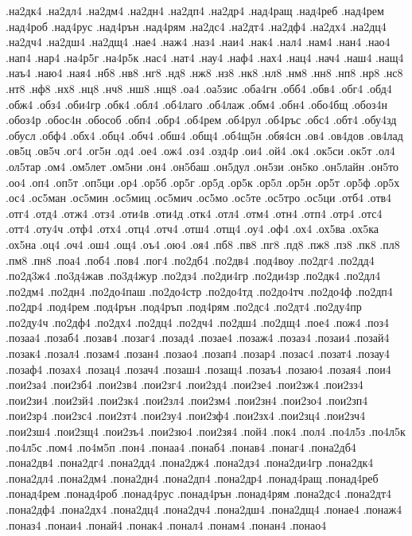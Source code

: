{.на2дк4
.на2дл4
.на2дм4
.на2дн4
.на2дп4
.на2др4
.над4ращ
.над4реб
.над4рем
.над4роб
.над4рус
.над4рън
.над4рям
.на2дс4
.на2дт4
.на2дф4
.на2дх4
.на2дц4
.на2дч4
.на2дш4
.на2дщ4
.нае4
.наж4
.наз4
.наи4
.нак4
.нал4
.нам4
.нан4
.нао4
.нап4
.нар4
.на4р5г
.на4р5к
.нас4
.нат4
.нау4
.наф4
.нах4
.нац4
.нач4
.наш4
.нащ4
.наъ4
.наю4
.ная4
.нб8
.нв8
.нг8
.нд8
.нж8
.нз8
.нк8
.нл8
.нм8
.нн8
.нп8
.нр8
.нс8
.нт8
.нф8
.нх8
.нц8
.нч8
.нш8
.нщ8
.оа4
.оа5зис
.оба4гн
.обб4
.обв4
.обг4
.обд4
.обж4
.обз4
.оби4гр
.обк4
.обл4
.об4лаго
.об4лаж
.обм4
.обн4
.обо4бщ
.обоз4н
.обоз4р
.обос4н
.обособ
.обп4
.обр4
.об4рем
.об4рул
.об4ръс
.обс4
.обт4
.обу4зд
.обусл
.обф4
.обх4
.обц4
.обч4
.обш4
.общ4
.об4щ5н
.обя4сн
.ов4
.ов4дов
.ов4лад
.ов5ц
.ов5ч
.ог4
.ог5н
.од4
.ое4
.ож4
.оз4
.озд4р
.ои4
.ой4
.ок4
.ок5си
.ок5т
.ол4
.ол5тар
.ом4
.ом5лет
.ом5ни
.он4
.он5баш
.он5дул
.он5зи
.он5ко
.он5лайн
.он5то
.оо4
.оп4
.оп5т
.оп5ци
.ор4
.ор5б
.ор5г
.ор5д
.ор5к
.ор5л
.ор5н
.ор5т
.ор5ф
.ор5х
.ос4
.ос5ман
.ос5мин
.ос5миц
.ос5мич
.ос5мо
.ос5те
.ос5тро
.ос5ци
.отб4
.отв4
.отг4
.отд4
.отж4
.отз4
.оти4в
.оти4д
.отк4
.отл4
.отм4
.отн4
.отп4
.отр4
.отс4
.отт4
.оту4ч
.отф4
.отх4
.отц4
.отч4
.отш4
.отщ4
.оу4
.оф4
.ох4
.ох5ва
.ох5ка
.ох5на
.оц4
.оч4
.ош4
.ощ4
.оъ4
.ою4
.оя4
.пб8
.пв8
.пг8
.пд8
.пж8
.пз8
.пк8
.пл8
.пм8
.пн8
.поа4
.поб4
.пов4
.пог4
.по2дб4
.по2дв4
.под4воу
.по2дг4
.по2дд4
.по2д3ж4
.по3д4жав
.по3д4жур
.по2дз4
.по2ди4гр
.по2ди4зр
.по2дк4
.по2дл4
.по2дм4
.по2дн4
.по2до4паш
.по2до4стр
.по2до4тд
.по2до4тч
.по2до4ф
.по2дп4
.по2др4
.под4рем
.под4рън
.под4ръп
.под4рям
.по2дс4
.по2дт4
.по2ду4пр
.по2ду4ч
.по2дф4
.по2дх4
.по2дц4
.по2дч4
.по2дш4
.по2дщ4
.пое4
.пож4
.поз4
.позаа4
.позаб4
.позав4
.позаг4
.позад4
.позае4
.позаж4
.позаз4
.позаи4
.позай4
.позак4
.позал4
.позам4
.позан4
.позао4
.позап4
.позар4
.позас4
.позат4
.позау4
.позаф4
.позах4
.позац4
.позач4
.позаш4
.позащ4
.позаъ4
.позаю4
.позая4
.пои4
.пои2за4
.пои2зб4
.пои2зв4
.пои2зг4
.пои2зд4
.пои2зе4
.пои2зж4
.пои2зз4
.пои2зи4
.пои2зй4
.пои2зк4
.пои2зл4
.пои2зм4
.пои2зн4
.пои2зо4
.пои2зп4
.пои2зр4
.пои2зс4
.пои2зт4
.пои2зу4
.пои2зф4
.пои2зх4
.пои2зц4
.пои2зч4
.пои2зш4
.пои2зщ4
.пои2зъ4
.пои2зю4
.пои2зя4
.пой4
.пок4
.пол4
.по4л5з
.по4л5к
.по4л5с
.пом4
.по4м5п
.пон4
.понаа4
.понаб4
.понав4
.понаг4
.пона2дб4
.пона2дв4
.пона2дг4
.пона2дд4
.пона2дж4
.пона2дз4
.пона2ди4гр
.пона2дк4
.пона2дл4
.пона2дм4
.пона2дн4
.пона2дп4
.пона2др4
.понад4ращ
.понад4реб
.понад4рем
.понад4роб
.понад4рус
.понад4рън
.понад4рям
.пона2дс4
.пона2дт4
.пона2дф4
.пона2дх4
.пона2дц4
.пона2дч4
.пона2дш4
.пона2дщ4
.понае4
.понаж4
.поназ4
.понаи4
.понай4
.понак4
.понал4
.понам4
.понан4
.понао4
}
